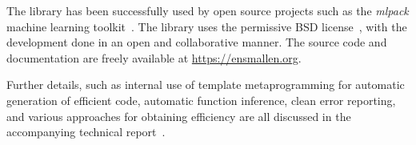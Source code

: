 \documentclass[twoside,11pt]{article}
\begin{document}
The library has been successfully used by open source projects
such as the {\it mlpack} machine learning toolkit~\citep{mlpack2018}.
The library uses the permissive BSD license~\citep{Laurent_2008},
with the development done in an open and collaborative manner.
The source code and documentation are freely available at \mbox{\url{https://ensmallen.org}}.

Further details, such as internal use of template metaprogramming
for automatic generation of efficient code, automatic function inference,
clean error reporting, and various approaches for obtaining efficiency
are all discussed in the accompanying technical report~\citep{ensmallen2020}.




\end{document}
